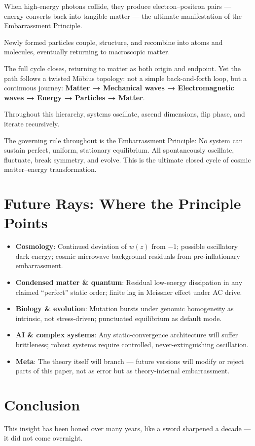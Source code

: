 \documentclass[10pt,a4paper]{article}
\begin{document}
When high-energy photons collide, they produce electron–positron pairs —
energy converts back into tangible matter —
the ultimate manifestation of the Embarrassment Principle.

Newly formed particles couple, structure, and recombine
into atoms and molecules, eventually returning to macroscopic matter.

The full cycle closes, returning to matter as both origin and endpoint.
Yet the path follows a twisted Möbius topology:
not a simple back-and-forth loop,
but a continuous journey:
\textbf{Matter → Mechanical waves → Electromagnetic waves → Energy → Particles → Matter}.

Throughout this hierarchy, systems oscillate, ascend dimensions,
flip phase, and iterate recursively.

The governing rule throughout is the Embarrassment Principle:
No system can sustain perfect, uniform, stationary equilibrium.
All spontaneously oscillate, fluctuate, break symmetry, and evolve.
This is the ultimate closed cycle of cosmic matter–energy transformation.

\section*{Future Rays: Where the Principle Points}
\begin{itemize}
\item \textbf{Cosmology}: Continued deviation of $w(z)$ from $-1$; possible oscillatory dark energy; cosmic microwave background residuals from pre-inflationary embarrassment.
\item \textbf{Condensed matter \& quantum}: Residual low-energy dissipation in any claimed “perfect” static order; finite lag in Meissner effect under AC drive.
\item \textbf{Biology \& evolution}: Mutation bursts under genomic homogeneity as intrinsic, not stress-driven; punctuated equilibrium as default mode.
\item \textbf{AI \& complex systems}: Any static-convergence architecture will suffer brittleness; robust systems require controlled, never-extinguishing oscillation.
\item \textbf{Meta}: The theory itself will branch — future versions will modify or reject parts of this paper, not as error but as theory-internal embarrassment.
\end{itemize}

\section*{Conclusion}
This insight has been honed over many years, like a sword sharpened a decade --- it did not come overnight.
\end{document}
